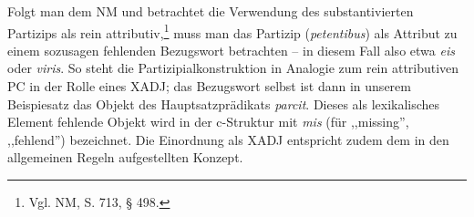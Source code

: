 \documentclass[12pt,a4paper]{article}
\begin{document}
Folgt man dem NM und betrachtet die Verwendung des substantivierten Partizips als rein attributiv,\footnote{Vgl. NM, S. 713, § 498.} muss man das Partizip (\textit{petentibus}) als Attribut zu einem sozusagen fehlenden Bezugswort betrachten -- in diesem Fall also etwa \textit{eis} oder \textit{viris}. So steht die Partizipialkonstruktion in Analogie zum rein attributiven PC in der Rolle eines XADJ; das Bezugswort selbst ist dann in unserem Beispiesatz das Objekt des Hauptsatzprädikats \textit{parcit}. Dieses als lexikalisches Element fehlende Objekt wird in der c-Struktur mit \textit{mis} (für ,,missing'', ,,fehlend'') bezeichnet.  
Die Einordnung als XADJ entspricht zudem dem in den allgemeinen Regeln aufgestellten Konzept.
\end{document}
